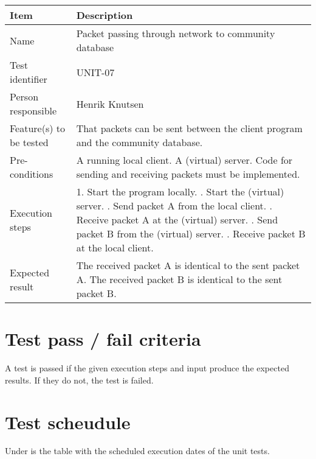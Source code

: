 \documentclass[12pt, fullpage, oneside]{report}
\begin{document}
		\begin{center}
			\begin{tabular}{ |  p{3.5cm} | p{10cm} | }
				\hline
				Item & Description \\ [5pt] \hline \hline
				Name & Packet passing through network to community database \\  [5pt] \hline
				Test identifier & UNIT-07 \\  [5pt] \hline
				Person responsible & Henrik Knutsen \\  [5pt] \hline
				Feature(s) to be tested & That packets can be sent between the client program and the community database.  \\  [5pt] \hline
				Pre-conditions & A running local client. A (virtual) server. Code for sending and receiving packets must be implemented. \\  [5pt] \hline
				Execution steps & 1. Start the program locally. \newline 2. Start the (virtual) server. \newline 3. Send packet A from the local client. \newline 4. Receive packet A at the (virtual) server. \newline 5. Send packet B from the (virtual) server.
					\newline 6. Receive packet B at the local client. \\  [5pt] \hline
				Expected result & The received packet A is identical to the sent packet A. The received packet B is identical to the sent packet B. \\  [5pt] \hline
			\end{tabular}
		\end{center}

	\section{Test pass / fail criteria}
		A test is passed if the given execution steps and input produce the expected results. If they do not, the test is failed.

	\section {Test scheudule}
		Under is the table with the scheduled execution dates of the unit tests.
\end{document}

